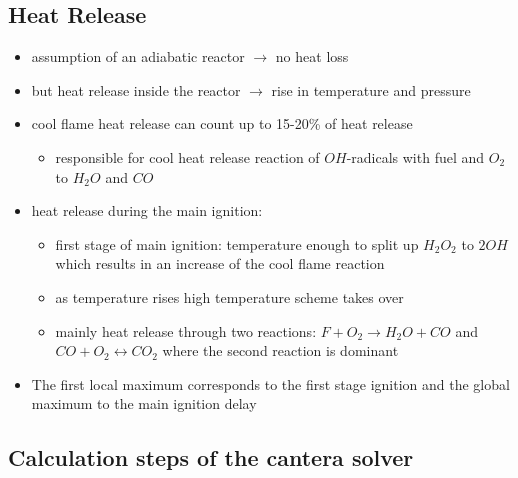 \documentclass[12pt,oneside,a4paper,english]{article}
\begin{document}
\subsection{Heat Release} %
\label{heat_release}
\begin{itemize}
\item{assumption of an adiabatic reactor $\rightarrow$ no heat loss}
\item{but heat release inside the reactor $\rightarrow$ rise in temperature and pressure}
\item{cool flame heat release can count up to 15-20\% of heat release}

	\begin{itemize}
	\item{responsible for cool heat release reaction of $OH$-radicals with fuel and $O_2$ to $H_2O$ and $CO$}
	\end{itemize}
	
\item{heat release during the main ignition:}

	\begin{itemize}
	\item{first stage of main ignition: temperature enough to split up $H_2O_2$ to $2OH$ which results in an increase of the cool flame reaction}
	\item{as temperature rises high temperature scheme takes over}
	\item{mainly heat release through two reactions: $F+O_2 \rightarrow H_2O + CO$ and $CO + O_2 \leftrightarrow CO_2$ where the second reaction is dominant}
	\end{itemize}
	
\item{The first local maximum corresponds to the first stage ignition and the global maximum to the main ignition delay} \\
	
\end{itemize}


\subsection{Calculation steps of the cantera solver} %
	
\end{document}

